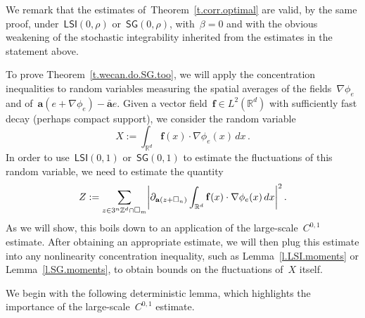 \documentclass[11pt]{article} %
\let\oldsquare\square %
\renewcommand{\square}{\oldsquare}
\numberwithin{equation}{section}
\theoremstyle{definition}
\let\originalleft\left
\let\originalright\right
\renewcommand{\left}{\mathopen{}\mathclose\bgroup\originalleft}
\renewcommand{\right}{\aftergroup\egroup\originalright}
\newcommand*{\Zd}{\ensuremath{\mathbb{Z}^d}}
\newcommand*{\Rd}{\ensuremath{\mathbb{R}^d}}
\newcommand{\f}{\mathbf{f}}
\renewcommand{\a}{\mathbf{a}}
\newcommand{\ahom}{\bar{\a}}
\newcommand{\cu}{\square}
\newcommand{\LSI}{\mathsf{LSI}}
\newcommand{\SG}{\mathsf{SG}}
\begin{document}
We remark that the estimates of~Theorem~\ref{t.corr.optimal} are valid, by the same proof, under~$\LSI(0,\rho)$ or~$\SG(0,\rho)$, with~$\beta = 0$ and with the obvious weakening of the stochastic integrability inherited from the estimates in the statement above. 

\smallskip

To prove Theorem~\ref{t.wecan.do.SG.too}, 
we will apply the concentration inequalities to 
random variables measuring the spatial averages of the fields~$\nabla \phi_e$ and of~$\a(e+\nabla \phi_e) - \ahom e$. Given a vector field~$\mathbf{f}\in L^2(\Rd)$ with sufficiently fast decay (perhaps compact support), we consider the random variable 
\begin{equation}
\label{e.rvX}
X:=
\int_{\Rd} \mathbf{f}(x)\cdot \nabla \phi_e(x)\,dx
\,.
\end{equation}
In order to use~$\LSI(0,1)$ or~$\SG(0,1)$ to estimate the fluctuations of this random variable, we need to estimate the quantity 
\begin{equation}
\label{e.Zderv}
Z := \sum_{z\in 3^n\Zd\cap \cu_m} \left|  \partial_{\a(z+\cu_n)} \int_{\Rd} \f(x)\cdot \nabla \phi_e(x)\,dx
\right|^2
\,.
\end{equation}
As we will show, this boils down to an application of the large-scale~$C^{0,1}$ estimate. After obtaining an appropriate estimate, we will then plug this estimate into any nonlinearity concentration inequality, such as Lemma~\ref{l.LSI.moments} or Lemma~\ref{l.SG.moments}, to obtain bounds on the fluctuations of~$X$ itself. 

\smallskip

We begin with the following deterministic lemma, which highlights the importance of the large-scale~$C^{0,1}$ estimate. 
\end{document}
